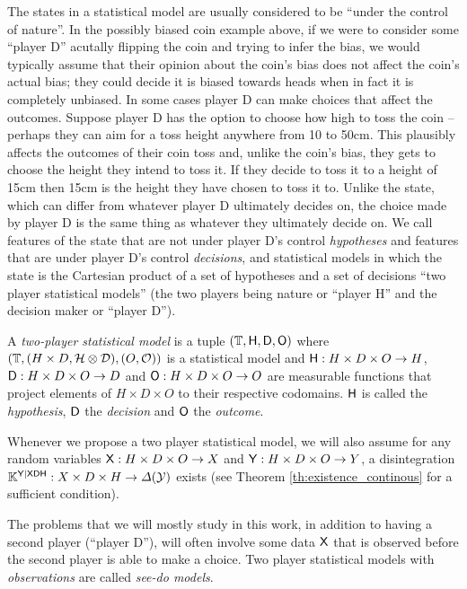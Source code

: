 The states in a statistical model are usually considered to be ``under the control of nature''. In the possibly biased coin example above, if we were to consider some ``player D'' acutally flipping the coin and trying to infer the bias, we would typically assume that their opinion about the coin's bias does not affect the coin's actual bias; they could decide it is biased towards heads when in fact it is completely unbiased. In some cases player D can make choices that affect the outcomes. Suppose player D has the option to choose how high to toss the coin -- perhaps they can aim for a toss height anywhere from 10 to 50cm. This plausibly affects the outcomes of their coin toss and, unlike the coin's bias, they gets to choose the height they intend to toss it. If they decide to toss it to a height of 15cm then 15cm is the height they have chosen to toss it to. Unlike the state, which can differ from whatever player D ultimately decides on, the choice made by player D is the same thing as whatever they ultimately decide on. We call features of the state that are not under player D's control \emph{hypotheses} and features that are under player D's control \emph{decisions}, and statistical models in which the state is the Cartesian product of a set of hypotheses and a set of decisions ``two player statistical models'' (the two players being nature or ``player H'' and the decision maker or ``player D'').

\begin{definition}\label{def:2p_stat}
A \emph{two-player statistical model} is a tuple $(\mathbb{T},\mathsf{H},\mathsf{D},\mathsf{O})$ where $(\mathbb{T},(H\times D,\mathcal{H}\otimes\mathcal{D}), (O,\mathcal{O}))$ is a statistical model and $\mathsf{H}:H\times D\times O\to H$, $\mathsf{D}:H\times D\times O\to D$ and $\mathsf{O}:H\times D\times O\to O$ are measurable functions that project elements of $H\times D\times O$ to their respective codomains. $\mathsf{H}$ is called the \emph{hypothesis}, $\mathsf{D}$ the \emph{decision} and $\mathsf{O}$ the \emph{outcome}.
\end{definition}

Whenever we propose a two player statistical model, we will also assume for any random variables $\mathsf{X}: H\times D\times O\to X$ and $\mathsf{Y}:H\times D\times O\to Y$, a disintegration $\mathbb{K}^{\mathsf{Y}|\mathsf{XDH}}:X\times D\times H\to \Delta(\mathcal{Y})$ exists (see Theorem \ref{th:existence_continous} for a sufficient condition).

The problems that we will mostly study in this work, in addition to having a second player (``player D''), will often involve some data $\mathsf{X}$ that is observed before the second player is able to make a choice. Two player statistical models with \emph{observations} are called \emph{see-do models}.

